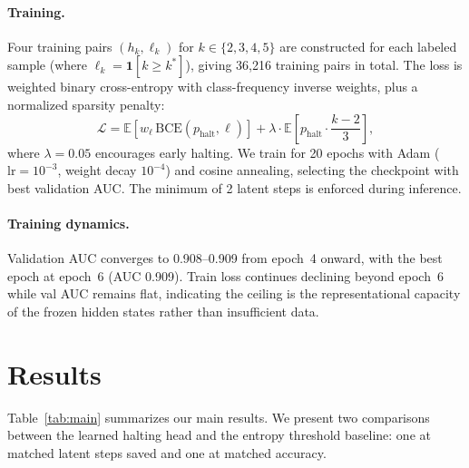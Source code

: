 \documentclass{article}
\begin{document}
\paragraph{Training.} Four training pairs $(h_k, \ell_k)$ for $k \in \{2, 3, 4, 5\}$ are constructed for each labeled sample (where $\ell_k = \mathbf{1}[k \geq k^*]$), giving 36{,}216 training pairs in total. The loss is weighted binary cross-entropy with class-frequency inverse weights, plus a normalized sparsity penalty:
\[
    \mathcal{L} = \mathbb{E}\!\left[w_{\ell}\,\mathrm{BCE}(p_{\mathrm{halt}}, \ell)\right] + \lambda \cdot \mathbb{E}\!\left[p_{\mathrm{halt}} \cdot \frac{k - 2}{3}\right],
\]
where $\lambda = 0.05$ encourages early halting. We train for 20 epochs with Adam ($\mathrm{lr} = 10^{-3}$, weight decay $10^{-4}$) and cosine annealing, selecting the checkpoint with best validation AUC. The minimum of 2 latent steps is enforced during inference.

\paragraph{Training dynamics.} Validation AUC converges to 0.908--0.909 from epoch~4 onward, with the best epoch at epoch~6 (AUC 0.909). Train loss continues declining beyond epoch~6 while val AUC remains flat, indicating the ceiling is the representational capacity of the frozen hidden states rather than insufficient data.

\section{Results}

Table~\ref{tab:main} summarizes our main results. We present two comparisons between the learned halting head and the entropy threshold baseline: one at matched latent steps saved and one at matched accuracy.
\end{document}
